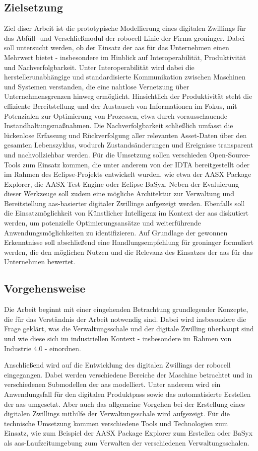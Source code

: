 \subsection{Zielsetzung}
Ziel diser Arbeit ist die prototypische Modellierung eines digitalen Zwillings für das Abfüll- und Verschließmodul der robocell-Linie der Firma groninger.
Dabei soll untersucht werden, ob der Einsatz der \acs{aas} für das Unternehmen einen Mehrwert bietet - insbesondere im Hinblick auf Interoperabilität, Produktivität und Nachverfolgbarkeit.
Unter Interoperabilität wird dabei die herstellerunabhängige und standardisierte Kommunikation zwischen Maschinen und Systemen verstanden, die eine nahtlose Vernetzung über Unternehmensgrenzen hinweg ermöglicht.
Hinsichtlich der Produktivität steht die effiziente Bereitstellung und der Austausch von Informationen im Fokus, mit Potenzialen zur Optimierung von Prozessen, etwa durch vorausschauende Instandhaltungsmaßnahmen. 
Die Nachverfolgbarkeit schließlich umfasst die lückenlose Erfassung und Rückverfolgung aller relevanten Asset-Daten über den gesamten Lebenszyklus, wodurch Zustandsänderungen und Ereignisse transparent und nachvollziehbar werden.
Für die Umsetzung sollen verschieden Open-Source-Tools zum Einsatz kommen, die unter anderem von der IDTA bereitgestellt oder im Rahmen des Eclipse-Projekts entwickelt wurden, wie etwa der AASX Package Explorer, die AASX Test Engine oder Eclipse BaSyx.
Neben der Evaluierung dieser Werkzeuge soll zudem eine mögliche Architektur zur Verwaltung und Bereitstellung \acs{aas}-basierter digitaler Zwillinge aufgezeigt werden.
Ebenfalls soll die Einsatzmöglichkeit von Künstlicher Intelligenz im Kontext der \acs{aas} diskutiert werden, um potenzielle Optimierungsansätze und weiterführende Anwendungsmöglichkeiten zu identifizieren.
Auf Grundlage der gewonnen Erkenntnisse soll abschließend eine Handlungsempfehlung für groninger formuliert werden, die den möglichen Nutzen und die Relevanz des Einsatzes der \acs{aas} für das Unternehmen bewertet.
\subsection{Vorgehensweise}
Die Arbeit beginnt mit einer eingehenden Betrachtung grundlegender Konzepte, die für das Verständnis der Arbeit notwendig sind. 
Dabei wird insbesondere die Frage geklärt, was die Verwaltungsschale und der digitale Zwilling überhaupt sind und wie diese sich im industriellen Kontext - insbesondere im Rahmen von Industrie 4.0 - einordnen.

Anschließend wird auf die Entwicklung des digitalen Zwillings der robocell eingegangen. 
Dabei werden verschiedene Bereiche der Maschine betrachtet und in verschiedenen Submodellen der \acs{aas} modelliert.
Unter anderem wird ein Anwendungsfall für den digitalen Produktpass sowie das automatisierte Erstellen der \acs{aas} umgesetzt.
Aber auch das allgemeine Vorgehen bei der Erstellung eines digitalen Zwillings mithilfe der Verwaltungsschale wird aufgezeigt.
Für die technische Umsetzung kommen verschiedene Tools und Technologien zum Einsatz, wie zum Beispiel der AASX Package Explorer zum Erstellen oder BaSyx als \acs{aas}-Laufzeitumgebung zum Verwalten der verschiedenen Verwaltungsschalen.


